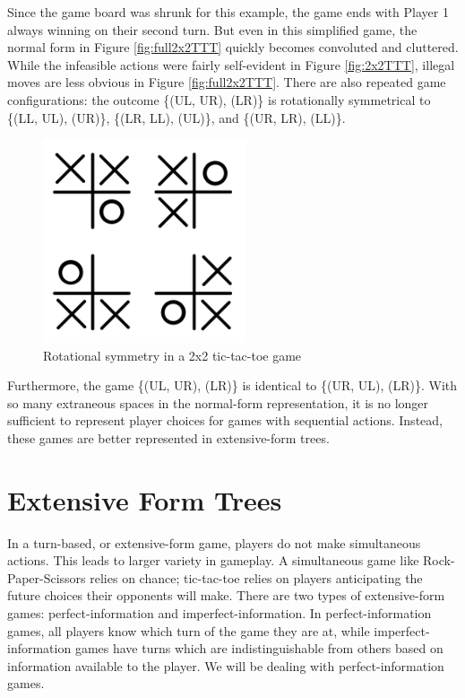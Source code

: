 Since the game board was shrunk for this example, the game ends with Player 1 always winning on their second turn. But even in this simplified game, the normal form in Figure \ref{fig:full2x2TTT} quickly becomes convoluted and cluttered. While the infeasible actions were fairly self-evident in Figure \ref{fig:2x2TTT}, illegal moves are less obvious in Figure \ref{fig:full2x2TTT}. There are also repeated game configurations: the outcome \{(UL, UR), (LR)\} is rotationally symmetrical to \{(LL, UL), (UR)\}, \{(LR, LL), (UL)\}, and \{(UR, LR), (LL)\}.
\begin{figure}[H]
  \centering
  \includegraphics[width=6cm]{figures/TTTRotation.png}
  \caption{Rotational symmetry in a 2x2 tic-tac-toe game}
  \label{fig:2x2TTTRotation}
\end{figure}
Furthermore, the game \{(UL, UR), (LR)\} is identical to \{(UR, UL), (LR)\}. With so many extraneous spaces in the normal-form representation, it is no longer sufficient to represent player choices for games with sequential actions. Instead, these games are better represented in extensive-form trees.\\

\section{Extensive Form Trees}
In a turn-based, or extensive-form game, players do not make simultaneous actions. This leads to larger variety in gameplay. A simultaneous game like Rock-Paper-Scissors relies on chance; tic-tac-toe relies on players anticipating the future choices their opponents will make. There are two types of extensive-form games: perfect-information and imperfect-information. In perfect-information games, all players know which turn of the game they are at, while imperfect-information games have turns which are indistinguishable from others based on information available to the player. We will be dealing with perfect-information games.\\

